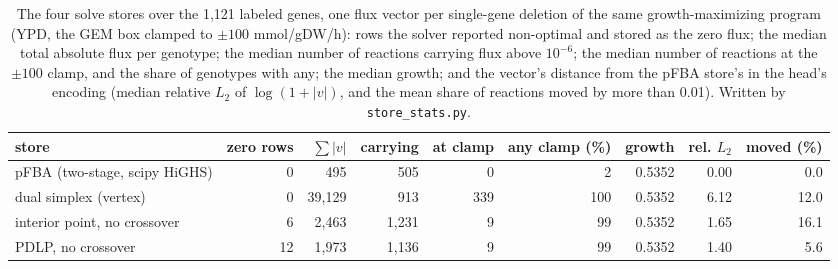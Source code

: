 \begin{table}[H]
  \centering
  \footnotesize
  \caption[What the solve stores carry]{The four solve stores over the 1,121 labeled genes, one flux vector per single-gene deletion of the same growth-maximizing program (YPD, the GEM box clamped to $\pm100$ mmol/gDW/h): rows the solver reported non-optimal and stored as the zero flux; the median total absolute flux per genotype; the median number of reactions carrying flux above $10^{-6}$; the median number of reactions at the $\pm100$ clamp, and the share of genotypes with any; the median growth; and the vector's distance from the pFBA store's in the head's encoding (median relative $L_2$ of $\log(1 + |v|)$, and the mean share of reactions moved by more than 0.01). Written by \texttt{store\_stats.py}.}
  \label{tab:store-stats}
  \begin{tabular}{@{}lrrrrrrrr@{}}
    \hline
    store & zero rows & $\sum|v|$ & carrying & at clamp & any clamp (\%) & growth & rel. $L_2$ & moved (\%) \\
    \hline
    pFBA (two-stage, scipy HiGHS) & 0 & 495 & 505 & 0 & 2 & 0.5352 & 0.00 & 0.0 \\
    dual simplex (vertex) & 0 & 39,129 & 913 & 339 & 100 & 0.5352 & 6.12 & 12.0 \\
    interior point, no crossover & 6 & 2,463 & 1,231 & 9 & 99 & 0.5352 & 1.65 & 16.1 \\
    PDLP, no crossover & 12 & 1,973 & 1,136 & 9 & 99 & 0.5352 & 1.40 & 5.6 \\
    \hline
  \end{tabular}
\end{table}
